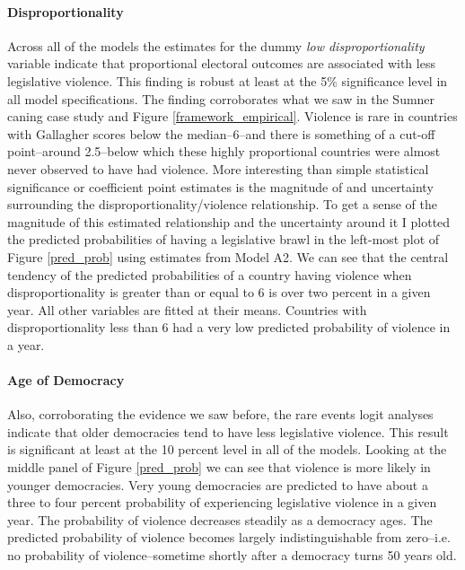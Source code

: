 \documentclass[a4paper]{article}\usepackage[]{graphicx}\usepackage[]{color}
\begin{document}
\paragraph{Disproportionality}

Across all of the models the estimates for the dummy {\emph{low disproportionality}} variable indicate that proportional electoral outcomes are associated with less legislative violence. This finding is robust at least at the 5\% significance level in all model specifications. The finding corroborates what we saw in the Sumner caning case study and Figure \ref{framework_empirical}. Violence is rare in countries with Gallagher scores below the median--6--and there is something of a cut-off point--around 2.5--below which these highly proportional countries were almost never observed to have had violence. More interesting than simple statistical significance or coefficient point estimates is the magnitude of and uncertainty surrounding the disproportionality/violence relationship. To get a sense of the magnitude of this estimated relationship and the uncertainty around it I plotted the predicted probabilities of having a legislative brawl in the left-most plot of Figure \ref{pred_prob} using estimates from Model A2. We can see that the central tendency of the predicted probabilities of a country having violence when disproportionality is greater than or equal to 6 is over two percent in a given year. All other variables are fitted at their means. Countries with disproportionality less than 6 had a very low predicted probability of violence in a year.

\paragraph{Age of Democracy}

Also, corroborating the evidence we saw before, the rare events logit analyses indicate that older democracies tend to have less legislative violence. This result is significant at least at the 10 percent level in all of the models. Looking at the middle panel of Figure \ref{pred_prob} we can see that violence is more likely in younger democracies. Very young democracies are predicted to have about a three to four percent probability of experiencing legislative violence in a given year. The probability of violence decreases steadily as a democracy ages. The predicted probability of violence becomes largely indistinguishable from zero--i.e. no probability of violence--sometime shortly after a democracy turns 50 years old.
\end{document}
